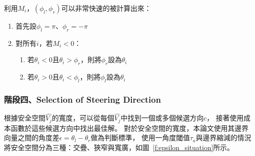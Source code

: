 利用$M_i$，$(\phi_l,\phi_r)$可以非常快速的被計算出來：
\begin{enumerate}
	\item{首先設$\phi_l = \pi$、$\phi_r = -\pi$}
	\item{對所有$i$，若$M_i < 0$：}
		\begin{enumerate}
			\item{若$\theta_i < 0$且$\theta_i > \phi_r$，則將$\phi_r$設為$\theta_i$}
			\item{若$\theta_i > 0$且$\theta_i < \phi_l$，則將$\phi_l$設為$\theta_i$}
		\end{enumerate}
\end{enumerate}

\subsubsection{階段四、Selection of Steering Direction}
根據安全空間$\hat{V_j}$的寬度，可以從每個$\hat{V_j}$中找到一個或多個候選方向$c$，
接著使用成本函數於這些候選方向中找出最佳解。
對於安全空間的寬度，本論文使用其邊界向量之間的角度差$\epsilon = \theta_l - \theta_r$做為判斷標準，
使用一角度閾值$\tau_a$與邊界縮減的情況將安全空間分為三種：交疊、狹窄與寬廣，如圖~\ref{f:epsilon_situation}所示。
